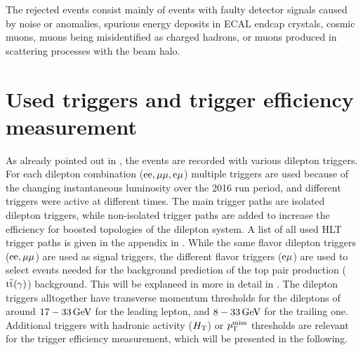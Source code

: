 The rejected events consist mainly of events with faulty detector signals caused by noise or anomalies, spurious energy deposits in ECAL endcap crystals, cosmic muons, muons being misidentified as charged hadrons, or muons produced in scattering processes with the beam halo.


\section{Used triggers and trigger efficiency measurement}\label{sec:triggEff}
As already pointed out in , the events are recorded with various dilepton triggers. For each dilepton combination ($\mathrm{e}\mathrm{e},{\mu}{\mu},\mathrm{e}{\mu}$) multiple triggers are used because of the changing instantaneous luminosity over the 2016 run period, and different triggers were active at different times. The main trigger paths are isolated dilepton triggers, while non-isolated trigger paths are added to increase the efficiency for boosted topologies of the dilepton system. A list of all used HLT trigger paths is given in the appendix in . While the same flavor dilepton triggers ($\mathrm{e}\mathrm{e},{\mu}{\mu}$) are used as signal triggers, the different flavor triggers ($\mathrm{e}{\mu}$) are used to select events needed for the background prediction of the top pair production (${\mathrm{t}\overline{\mathrm{t}}}(\gamma)$) background. This will be explaneed in more in detail in . The dilepton triggers alltogether have transverse momentum thresholds for the dileptons of around $17-33\,\text{Ge\hspace{-.08em}V}$ for the leading lepton, and $8-33\,\text{Ge\hspace{-.08em}V}$ for the trailing one. Additional triggers with hadronic activity ($H_{\mathrm{T}}$) or $p_{\mathrm{T}}^\text{miss}$ thresholds are relevant for the trigger efficiency measurement, which will be presented in the following.
